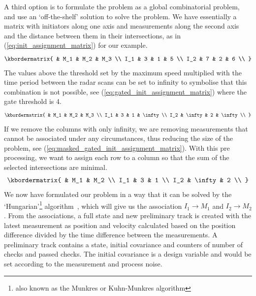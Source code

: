 A third option is to formulate the problem as a global combinatorial problem, and use an `off-the-shelf' solution to solve the problem. We have essentially a matrix with initiators along one axis and measurements along the second axis and the distance between them in their intersections, as in (\ref{eq:init_assignment_matrix}) for our example.
\begin{equation}\label{eq:init_assignment_matrix}
\kbordermatrix{
	 	& M_1 	& M_2 	& M_3	\\
    I_1 & 3 	& 1 	& 5 	\\
    I_2 & 7 	& 2 	& 6		\\
}
\end{equation}
The values above the threshold set by the maximum speed multiplied with the time period between the radar scans can be set to infinity to symbolise that this combination is not possible, see (\ref{eq:gated_init_assignment_matrix}) where the gate threshold is 4.
\begin{equation}\label{eq:gated_init_assignment_matrix}
\kbordermatrix{
	 	& M_1 		& M_2 	& M_3		\\
    I_1 & 3 		& 1 	& \infty 	\\
    I_2 & \infty 	& 2 	& \infty	\\
}
\end{equation}
If we remove the columns with only infinity, we are removing measurements that cannot be associated under any circumstances, thus reducing the size of the problem, see (\ref{eq:masked_gated_init_assignment_matrix}). With this pre processing, we want to assign each row to a column so that the sum of the selected intersections are minimal. 
\begin{equation}\label{eq:masked_gated_init_assignment_matrix}
\kbordermatrix{
	 	& M_1 		& M_2	\\
    I_1 & 3 		& 1  	\\ 
    I_2 & \infty 	& 2 	\\
}
\end{equation}
We now have formulated our problem in a way that it can be solved by the `Hungarian'\footnote{also known as the Munkres or Kuhn-Munkres algorithm} algorithm~\cite{Munkres1957}, which will give us the association \(I_1 \rightarrow M_1\) and \(I_2 \rightarrow M_2\). From the associations, a full state and new preliminary track is created with the latest measurement as position and velocity calculated based on the position difference divided by the time difference between the measurements. A preliminary track contains a state, initial covariance and counters of number of checks and passed checks. The initial covariance is a design variable and would be set according to the measurement and process noise.

